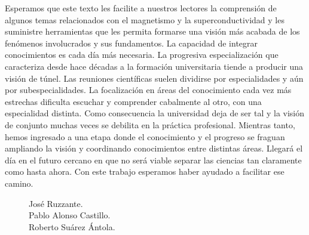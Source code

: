 \documentclass[
11pt, %
spanish,
singlespacing, %
parskip, %
headsepline, %
]{MastersDoctoralThesis} %
\begin{document}
\hspace{20mm}Esperamos que este texto les facilite a nuestros lectores la comprensión de algunos temas relacionados con el magnetismo y la superconductividad y les suministre herramientas que les permita formarse una visión más acabada de los fenómenos involucrados y sus fundamentos. La capacidad de integrar conocimientos es cada día más necesaria.  La progresiva especialización que caracteriza desde hace décadas a la formación universitaria tiende a producir una visión de túnel. Las reuniones científicas suelen dividirse por especialidades y aún por subespecialidades. La focalización en áreas del conocimiento cada vez más estrechas dificulta escuchar y comprender cabalmente al otro, con una especialidad distinta. Como consecuencia la universidad deja de ser tal y la visión de conjunto muchas veces se debilita en la práctica profesional.  Mientras tanto, hemos ingresado a una etapa donde el conocimiento y el progreso se fraguan ampliando la visión y coordinando conocimientos entre distintas áreas. Llegará el día en el futuro cercano en que no será viable separar las ciencias tan claramente como hasta ahora. Con este trabajo esperamos haber ayudado a facilitar ese camino.\\

\begin{figure}[H]
  \begin{minipage}[b]{0.7\textwidth}
	  \vspace{0cm}
  \end{minipage}
  \hfill
  \begin{minipage}[b]{0.3\textwidth}
  
José Ruzzante.\\
Pablo Alonso Castillo.\\
Roberto Suárez Ántola.\\
  \end{minipage}
\end{figure}






	
	



\vspace{10mm}
\end{document}
